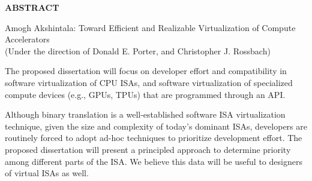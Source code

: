 
\begin{center}
\vspace*{52pt}
{\normalfont\textbf{ABSTRACT}}
\vspace{11pt}

\begin{singlespace}
Amogh Akshintala: Toward Efficient and Realizable Virtualization of Compute Accelerators \\
(Under the direction of Donald E. Porter, and Christopher J. Rossbach)
\end{singlespace}
\end{center}

The proposed dissertation will focus on developer effort and compatibility in
software virtualization of CPU ISAs, and software virtualization of
specialized compute devices (e.g., GPUs, TPUs) that are programmed through an
API.

Although binary translation is a well-established software ISA virtualization
technique, given the size and complexity of today's dominant ISAs, developers
are routinely forced to adopt ad-hoc techniques to prioritize development
effort. The proposed dissertation will present a principled approach to
determine priority among different parts of the ISA. We believe this data will
be useful to designers of virtual ISAs as well.

